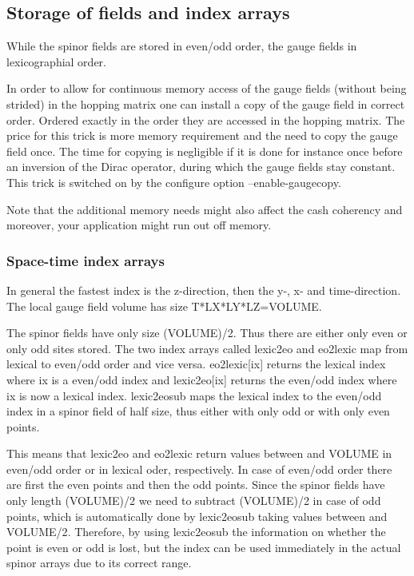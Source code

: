 \subsection{Storage of fields and index arrays}
\label{subsec:storage}

While the spinor fields are stored in even/odd order, the gauge
fields in lexicographial order.

In order to allow for continuous
memory access of the gauge fields (without being strided) in the
hopping matrix one can install a copy of the gauge field in correct
order. Ordered exactly in the order they are accessed in the hopping
matrix. The price for this trick is more memory requirement
and the need to copy the gauge field once. The time for copying is
negligible if it is done for instance once before an inversion of the
Dirac operator, during which the gauge fields stay constant. This
trick is switched on by the configure option {\ttfamily
  --enable-gaugecopy}.

Note that the additional memory needs might also affect the cash
coherency and moreover, your application might run out off memory.

\subsubsection{Space-time index arrays}

In general the fastest index is the z-direction, then the y-, x- and
time-direction. The local gauge field volume has size
{\ttfamily T*LX*LY*LZ=VOLUME}. 

The spinor fields have only size {\ttfamily (VOLUME)/2}. Thus
there are either only even or only odd sites stored. The two
index arrays called {\ttfamily lexic2eo} and {\ttfamily eo2lexic} map
from lexical to even/odd order and vice versa. {\ttfamily
  eo2lexic[ix]} returns the lexical index where {\ttfamily ix} is a
even/odd index and {\ttfamily lexic2eo[ix]} returns the even/odd index
where {\ttfamily ix} is now a lexical index. {\ttfamily lexic2eosub}
maps the lexical index to the even/odd index in a spinor field of half
size, thus either with only odd or with only even points.

This means that {\ttfamily lexic2eo} and {\ttfamily eo2lexic} return
values between {} and {\ttfamily VOLUME} in even/odd order
or in lexical oder, respectively. In case of even/odd order there are
first the even points and then the odd points. Since the spinor
fields have only length {\ttfamily (VOLUME)/2} we need to subtract
{\ttfamily (VOLUME)/2} in case of odd points, which is automatically
done by {\ttfamily lexic2eosub} taking values between {} and {\ttfamily VOLUME/2}. Therefore, by using {\ttfamily lexic2eosub}
the information on whether the point is even or odd is lost, but the
index can be used immediately in the actual spinor arrays due to its
correct range.

